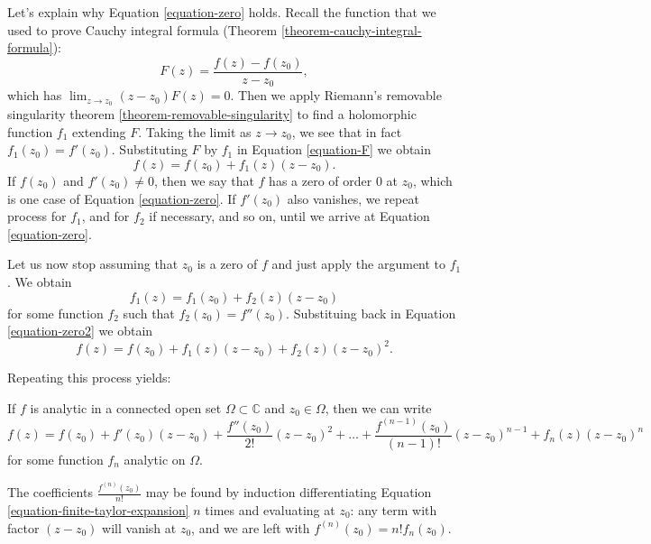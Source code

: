 \medskip\noindent
Let's explain why Equation
\ref{equation-zero} holds.
Recall the function that we used to prove
Cauchy integral formula
(Theorem
\ref{theorem-cauchy-integral-formula}):
\begin{equation}
\label{equation-F}
F(z)=\frac{f(z)-f(z_0)}{z-z_0},
\end{equation}
which has $\lim_{z\to z_0} (z-z_0)F(z)=0$.
Then we apply
Riemann's removable singularity theorem
\ref{theorem-removable-singularity}
to find a holomorphic function $f_1$
extending $F$.
Taking the limit as $z \to z_0$, we see that
in fact
$f_1(z_0)=f'(z_0)$.
Substituting $F$ by $f_1$
in Equation \ref{equation-F} we obtain
\begin{equation}
\label{equation-zero2}
f(z)=f(z_0)+f_1(z)(z-z_0).
\end{equation}
If $f(z_0)$ and $f'(z_0)\neq 0$, then we say
that $f$ has
a zero of order 0 at $z_0$, which is one case
of
Equation \ref{equation-zero}. If  $f'(z_0)$
also vanishes,
we repeat process for $f_1$, and for $f_2$ if
necessary, and so on,
until we arrive at Equation
\ref{equation-zero}.

Let us now stop assuming that $z_0$ is a zero
of $f$
and just apply the argument to $f_1$. We
obtain
$$
f_1(z)=f_1(z_0)+f_2(z)(z-z_0)
$$
for some function $f_2$ such that
$f_2(z_0)=f''(z_0)$.
Substituing back in Equation
\ref{equation-zero2} we obtain
$$
f(z)=f(z_0)+f_1(z)(z-z_0)+f_2(z)(z-z_0)^2.
$$

Repeating this process yields:

\begin{lemma}
\label{lemma-finite-taylor-expansion}
\begin{reference}
\cite[Chapter 4, Section 3, Subsection 2,
Theorem 8]{ahl}
\end{reference}
If $f$ is analytic in a connected open set
$\Omega\subset\mathbb{C}$ and $z_0 \in
\Omega$,
then we can write
\begin{equation}
\label{equation-finite-taylor-expansion}
f(z)=f(z_0)+f'(z_0)(z-z_0)+\frac{f''(z_0)}
{2!}(z-z_0)^2+\ldots
+\frac{f^{(n-1)}(z_0)}{(n-1)!}(z-z_0)^{n-1}+
f_n(z)(z-z_0)^n
\end{equation}
for some function $f_n$ analytic on $\Omega$.
\end{lemma}

\noindent
The coefficients $\frac{f^{(n)}(z_0)}{n!}$
may be found
by induction differentiating
Equation
\ref{equation-finite-taylor-expansion} $n$
times
and evaluating at $z_0$:
any term with
factor $(z-z_0)$ will vanish at $z_0$, and we
are left with
$f^{(n)}(z_0)=n!f_n(z_0)$.


